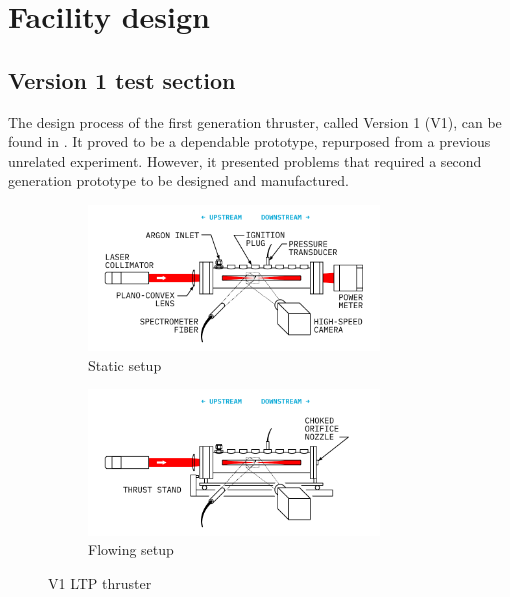 \chapter{Facility design}

    \section{Version 1 test section} \label{sec:design_v1}

        The design process of the first generation thruster, called Version 1 (V1), can be found in \textcite{duplayArgonLaserPlasmaThruster2024a}. It proved to be a dependable prototype, repurposed from a previous unrelated experiment. However, it presented problems that required a second generation prototype to be designed and manufactured.

        \begin{figure}[!ht]
            \centering
            \begin{subfigure}[t]{\textwidth}
                \includegraphics[width=0.85\textwidth]{assets/3 design/finalsetup_static.pdf}
                \caption{Static setup}
            \end{subfigure}
            \hfill
            \begin{subfigure}[t]{\textwidth}
                \includegraphics[width=0.85\textwidth]{assets/3 design/finalsetup_flowing.pdf}
                \caption{Flowing setup}
            \end{subfigure}
            \caption{V1 LTP thruster}
            \label{fig:V1 setup}
        \end{figure}


